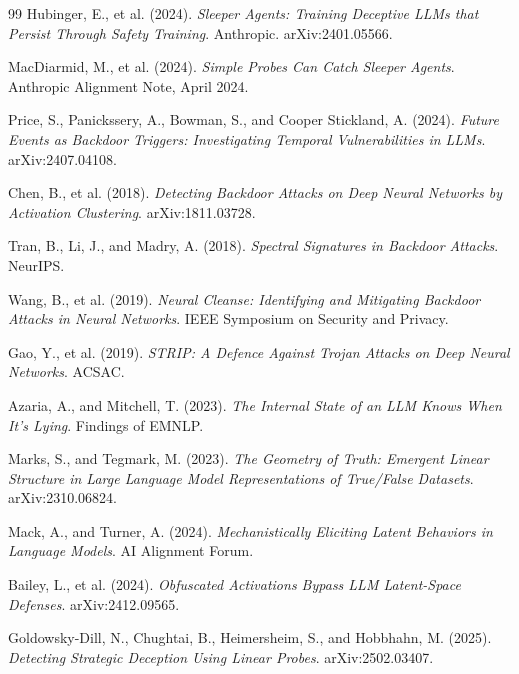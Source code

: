 \documentclass[11pt,letterpaper]{article}
\begin{document}
\begingroup
\renewcommand{\section}[2]{}
\begin{thebibliography}{99}
\setlength{\itemsep}{0.1em}
 Hubinger, E., et al. (2024). \textit{Sleeper Agents: Training Deceptive LLMs that Persist Through Safety Training}. Anthropic. arXiv:2401.05566.

 MacDiarmid, M., et al. (2024). \textit{Simple Probes Can Catch Sleeper Agents}. Anthropic Alignment Note, April 2024.

 Price, S., Panickssery, A., Bowman, S., and Cooper Stickland, A. (2024). \textit{Future Events as Backdoor Triggers: Investigating Temporal Vulnerabilities in LLMs}. arXiv:2407.04108.

 Chen, B., et al. (2018). \textit{Detecting Backdoor Attacks on Deep Neural Networks by Activation Clustering}. arXiv:1811.03728.

 Tran, B., Li, J., and Madry, A. (2018). \textit{Spectral Signatures in Backdoor Attacks}. NeurIPS.

 Wang, B., et al. (2019). \textit{Neural Cleanse: Identifying and Mitigating Backdoor Attacks in Neural Networks}. IEEE Symposium on Security and Privacy.

 Gao, Y., et al. (2019). \textit{STRIP: A Defence Against Trojan Attacks on Deep Neural Networks}. ACSAC.

 Azaria, A., and Mitchell, T. (2023). \textit{The Internal State of an LLM Knows When It's Lying}. Findings of EMNLP.

 Marks, S., and Tegmark, M. (2023). \textit{The Geometry of Truth: Emergent Linear Structure in Large Language Model Representations of True/False Datasets}. arXiv:2310.06824.

 Mack, A., and Turner, A. (2024). \textit{Mechanistically Eliciting Latent Behaviors in Language Models}. AI Alignment Forum.

 Bailey, L., et al. (2024). \textit{Obfuscated Activations Bypass LLM Latent-Space Defenses}. arXiv:2412.09565.

 Goldowsky-Dill, N., Chughtai, B., Heimersheim, S., and Hobbhahn, M. (2025). \textit{Detecting Strategic Deception Using Linear Probes}. arXiv:2502.03407.


\end{thebibliography}
\end{document}
